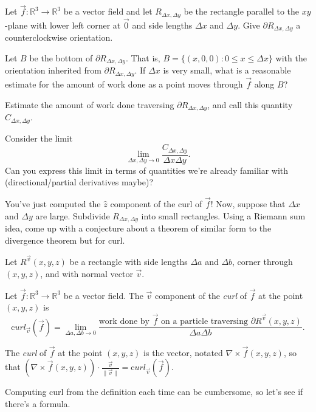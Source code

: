 \documentclass{problemset}
\newcommand{\R}{\mathbb{R}}
\begin{document}
	\question
	Let $\vec f:\R^3\to\R^3$ be a vector field and let $R_{\Delta x, \Delta y}$ be the 
	rectangle parallel to the $xy$-plane with lower left corner at $\vec 0$ and side lengths
	$\Delta x$ and $\Delta y$.  Give $\partial R_{\Delta x, \Delta y}$ a counterclockwise
	orientation.
	\begin{parts}
		\item Let $B$ be the bottom of $\partial R_{\Delta x, \Delta y}$.  That is, 
			$B=\{(x,0,0): 0\leq x\leq \Delta x\}$ with the orientation
			inherited from $\partial R_{\Delta x, \Delta y}$.  If $\Delta x$
			is very small, what is a reasonable estimate for the amount of work
			done as a point moves through $\vec f$ along $B$?
		\item Estimate the amount of work done traversing $\partial R_{\Delta x, \Delta y}$,
			and call this quantity $C_{\Delta x, \Delta y}$.
		\item Consider the limit
			\[
				\lim_{\Delta x,\Delta y\to 0} \frac{C_{\Delta x, \Delta y}}{\Delta x \Delta y}.
			\]
			Can you express this limit in terms of quantities we're already familiar with 
			(directional/partial derivatives maybe)?
		\item You've just computed the $\hat z$ component of the curl of $\vec f$!
			Now, suppose that $\Delta x$ and $\Delta y$ are large.  Subdivide $R_{\Delta x, \Delta y}$
			into small rectangles.  Using a Riemann sum idea, come up with a conjecture
			about a theorem of similar form to the divergence theorem but for curl.
	\end{parts}

	\begin{definition}[Curl]
		Let $R^{\vec v} (x,y,z)$ be a rectangle with side lengths $\Delta a$ and $\Delta b$, corner through
		$(x,y,z)$, and with normal
		vector $\vec v$. 

		Let $\vec f:\R^3\to\R^3$ be a vector field.
		The $\vec v$ component of the \emph{curl} of $\vec f$ at the point $(x,y,z)$ is
		\[
			{\mathrm curl}_{\vec v}(\vec f) = \lim_{\Delta a,\Delta b\to 0}
			\frac{\text{work done by $\vec f$ on a particle traversing $\partial R^{\vec v} (x,y,z)$}}{\Delta a \Delta b}.
		\]

		The \emph{curl} of $\vec f$ at the point $(x,y,z)$ is the vector, notated $\nabla \times \vec f(x,y,z)$, so that
		$(\nabla \times \vec f(x,y,z))\cdot \frac{\vec v}{\|\vec v\|} = {\mathrm curl}_{\vec v}(\vec f)$.
	\end{definition}

	Computing curl from the definition each time can be cumbersome, so let's see
	if there's a formula.
	
\end{document}

